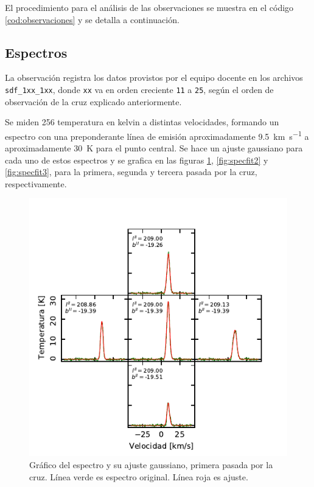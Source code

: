 El procedimiento para el análisis de las observaciones se muestra en el código \ref{cod:observaciones} y se detalla a continuación.

\subsection{Espectros}

La observación registra los datos provistos por el equipo docente en los archivos \texttt{sdf\_1xx\_1xx}, donde \texttt{xx} va en orden creciente \texttt{11} a \texttt{25}, según el orden de observación de la cruz explicado anteriormente. 

Se miden 256 temperatura en kelvin a distintas velocidades, formando un espectro con una preponderante línea de emisión aproximadamente \SI{9.5}{\kilo\meter\per\second} a aproximadamente \SI{30}{\kelvin} para el punto central. Se hace un ajuste gaussiano para cada uno de estos espectros y se grafica en las figuras \ref{fig:specfit1}, \ref{fig:specfit2} y \ref{fig:specfit3}, para la primera, segunda y tercera pasada por la cruz, respectivamente.

\begin{figure}[p]
	\centering
	\includegraphics{rsc/specfit1.pdf}
	\caption{Gráfico del espectro y su ajuste gaussiano, primera pasada por la cruz. Línea verde es espectro original. Línea roja es ajuste.}
	\label{fig:specfit1}
\end{figure}

